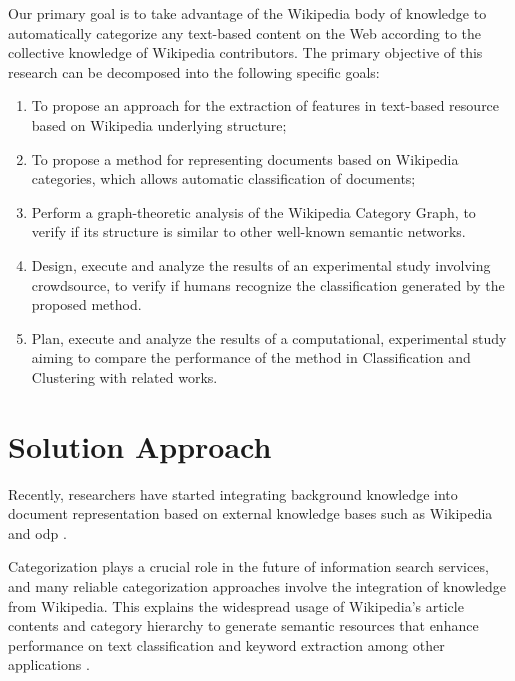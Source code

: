Our primary goal is to take advantage of the Wikipedia body of knowledge to automatically categorize any text-based content on the Web according to the collective knowledge of Wikipedia contributors.
The primary objective of this research can be decomposed into the following specific goals:



\begin{enumerate}[i]
\item  To propose an approach for the extraction of features in text-based resource based on Wikipedia underlying structure;

\item To propose a method for representing  documents based on Wikipedia categories, which allows automatic classification of documents;

\item Perform a graph-theoretic analysis of the Wikipedia Category Graph, to verify if its structure is similar to other well-known semantic networks.

\item Design, execute and analyze the results of an experimental study involving crowdsource, to verify if humans recognize the classification 
generated by the proposed method.

\item Plan, execute and analyze the results of a computational, experimental study aiming to compare the performance of the method in Classification and Clustering with related works.

\end{enumerate}

\section{\hspace*{3pt}Solution Approach}

Recently, researchers have started integrating background knowledge into document representation based on external knowledge bases such as Wikipedia and \gls{odp} \cite{rafi2012content}.

Categorization plays a crucial role in the future of information search services, and many reliable categorization approaches involve the integration of knowledge from Wikipedia. This explains the widespread usage of Wikipedia’s article contents and category hierarchy to generate semantic resources that enhance performance on text classification and keyword extraction among other applications \cite{gantner2009automatic}. 

